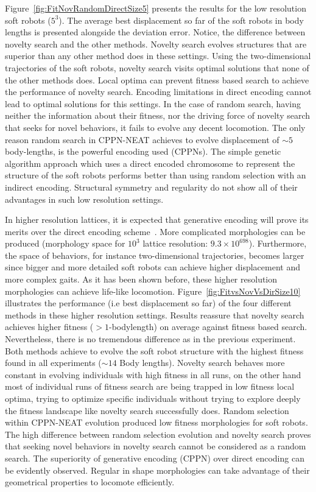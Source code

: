 \documentclass{sig-alternate}
\begin{document}
Figure~\ref{fig:FitNovRandomDirectSize5} presents the results for the low resolution soft robots ($5^3$). The average best displacement so far of the soft robots in body lengths is presented alongside the deviation error. Notice, the difference between novelty search and the other methods. Novelty search evolves structures that are superior than any other method does in these settings. Using the two-dimensional trajectories of the soft robots, novelty search visits optimal solutions that none of the other methods does. Local optima can prevent fitness based search to achieve the performance of novelty search. Encoding limitations in direct encoding cannot lead to optimal solutions for this settings. In the case of random search, having neither the information about their fitness, nor the driving force of novelty search that seeks for novel behaviors, it fails to evolve any decent locomotion. The only reason random search in CPPN-NEAT achieves to evolve displacement of $\sim 5$ body-lengths, is the powerful encoding used (CPPNs). The simple genetic algorithm approach which uses a direct encoded chromosome to represent the structure of the soft robots performs better than using random selection with an indirect encoding. Structural symmetry and regularity do not show all of their advantages in such low resolution settings.

In higher resolution lattices, it is expected that generative encoding will prove its merits over the direct encoding scheme~\cite{cheney2013unshackling,stanley2007compositional}. More complicated morphologies can be produced (morphology space for $10^3$ lattice resolution: $9.3 \times 10^{698}$). Furthermore, the space of behaviors, for instance two-dimensional trajectories, becomes larger since bigger and more detailed soft robots can achieve higher displacement and more complex gaits. As it has been shown before, these higher resolution morphologies can achieve life-like locomotion. Figure~\ref{fig:FitvsNovVsDirSize10} illustrates the performance (i.e best displacement so far) of the four different methods in these higher resolution settings. Results reassure that novelty search achieves higher fitness ($> 1$-bodylength) on average against fitness based search. Nevertheless, there is no tremendous difference as in the previous experiment. Both methods achieve to evolve the soft robot structure with the highest fitness found in all experiments ($\sim 14$ Body lengths). Novelty search behaves more constant in evolving individuals with high fitness in all runs, on the other hand most of individual runs of fitness search are being trapped in low fitness local optima, trying to optimize specific individuals without trying to explore deeply the fitness landscape like novelty search successfully does. Random selection within CPPN-NEAT evolution produced low fitness morphologies for soft robots. The high difference between random selection evolution and novelty search proves that seeking novel behaviors in novelty search cannot be considered as a random search. The superiority of generative encoding (CPPN) over direct encoding can be evidently observed. Regular in shape morphologies can take advantage of their geometrical properties to locomote efficiently.
\end{document}
